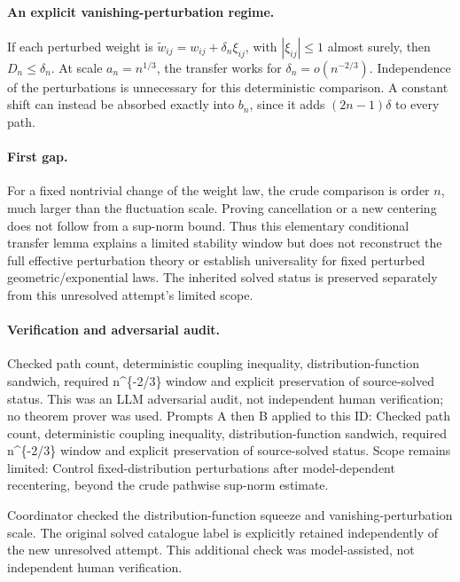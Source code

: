 \documentclass[11pt]{article}
\begin{document}
\paragraph{An explicit vanishing-perturbation regime.}If each perturbed weight is \(\widetilde w_{ij}=w_{ij}+\delta_n\xi_{ij}\), with \(|\xi_{ij}|\le1\) almost surely, then \(D_n\le\delta_n\). At scale \(a_n=n^{1/3}\), the transfer works for \(\delta_n=o(n^{-2/3})\). Independence of the perturbations is unnecessary for this deterministic comparison. A constant shift can instead be absorbed exactly into \(b_n\), since it adds \((2n-1)\delta\) to every path.
\paragraph{First gap.}For a fixed nontrivial change of the weight law, the crude comparison is order \(n\), much larger than the fluctuation scale. Proving cancellation or a new centering does not follow from a sup-norm bound. Thus this elementary conditional transfer lemma explains a limited stability window but does not reconstruct the full effective perturbation theory or establish universality for fixed perturbed geometric/exponential laws. The inherited solved status is preserved separately from this unresolved attempt's limited scope.

\paragraph{Verification and adversarial audit.}
Checked path count, deterministic coupling inequality, distribution-function sandwich, required n\textasciicircum{}\{-2/3\} window and explicit preservation of source-solved status. This was an LLM adversarial audit, not independent human verification; no theorem prover was used. Prompts A then B applied to this ID: Checked path count, deterministic coupling inequality, distribution-function sandwich, required n\textasciicircum{}\{-2/3\} window and explicit preservation of source-solved status. Scope remains limited: Control fixed-distribution perturbations after model-dependent recentering, beyond the crude pathwise sup-norm estimate.

Coordinator checked the distribution-function squeeze and vanishing-perturbation scale. The original solved catalogue label is explicitly retained independently of the new unresolved attempt. This additional check was model-assisted, not independent human verification.
\end{document}
